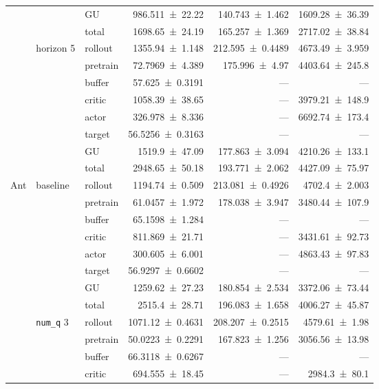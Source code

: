 {\begin{longtable}{@{}lllrrr@{}}
     &  & GU & \num{986.511+-22.22} & \num{140.743+-1.462} & \num{1609.28+-36.39} \\
     &  & total & \num{1698.65+-24.19} & \num{165.257+-1.369} & \num{2717.02+-38.84} \\
    \addlinespace[2pt]
     & horizon 5 & rollout & \num{1355.94+-1.148} & \num{212.595+-0.4489} & \num{4673.49+-3.959} \\
     &  & pretrain & \num{72.7969+-4.389} & \num{175.996+-4.97} & \num{4403.64+-245.8} \\
     &  & buffer & \num{57.625+-0.3191} & --- & --- \\
     &  & critic & \num{1058.39+-38.65} & --- & \num{3979.21+-148.9} \\
     &  & actor & \num{326.978+-8.336} & --- & \num{6692.74+-173.4} \\
     &  & target & \num{56.5256+-0.3163} & --- & --- \\
     &  & GU & \num{1519.9+-47.09} & \num{177.863+-3.094} & \num{4210.26+-133.1} \\
     &  & total & \num{2948.65+-50.18} & \num{193.771+-2.062} & \num{4427.09+-75.97} \\
    \addlinespace[2pt]
    \midrule
    Ant & baseline & rollout & \num{1194.74+-0.509} & \num{213.081+-0.4926} & \num{4702.4+-2.003} \\
     &  & pretrain & \num{61.0457+-1.972} & \num{178.038+-3.947} & \num{3480.44+-107.9} \\
     &  & buffer & \num{65.1598+-1.284} & --- & --- \\
     &  & critic & \num{811.869+-21.71} & --- & \num{3431.61+-92.73} \\
     &  & actor & \num{300.605+-6.001} & --- & \num{4863.43+-97.83} \\
     &  & target & \num{56.9297+-0.6602} & --- & --- \\
     &  & GU & \num{1259.62+-27.23} & \num{180.854+-2.534} & \num{3372.06+-73.44} \\
     &  & total & \num{2515.4+-28.71} & \num{196.083+-1.658} & \num{4006.27+-45.87} \\
    \addlinespace[2pt]
     & \texttt{num\_\allowbreak q} 3 & rollout & \num{1071.12+-0.4631} & \num{208.207+-0.2515} & \num{4579.61+-1.98} \\
     &  & pretrain & \num{50.0223+-0.2291} & \num{167.823+-1.256} & \num{3056.56+-13.98} \\
     &  & buffer & \num{66.3118+-0.6267} & --- & --- \\
     &  & critic & \num{694.555+-18.45} & --- & \num{2984.3+-80.1} \\

\end{longtable}}
